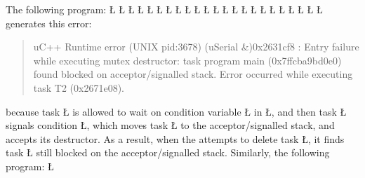 \documentclass[openright,twoside]{report}
\begin{document}
The following program:
\LGinlinefalse\LGbegin\lgrinde
\L{}
\L{\LB{}}
\L{}
\L{\LB{}}
\L{}
\L{\LB{}}
\L{\LB{}}
\CE{}\L{\LB{}}
\CE{}\L{\LB{}}
\CE{}\L{\LB{}}
\L{\LB{\};}}
\endlgrinde\LGend
\LGinlinefalse\LGbegin\lgrinde
\L{}
\L{\LB{}}
\L{\LB{}}
\L{}
\L{\LB{}}
\L{\LB{\};}}
\endlgrinde\LGend
\LGinlinefalse\LGbegin\lgrinde
\L{}
\L{\LB{}}
\L{\LB{}}
\L{\LB{}}
\CE{}\L{\LB{}}
\L{\LB{\}}}
\endlgrinde\LGend
generates this error:
\begin{quote}
\BGfont
uC++ Runtime error (UNIX pid:3678) (uSerial \&)0x2631cf8 : Entry failure while executing mutex destructor: task program main (0x7ffcba9bd0e0) found blocked on acceptor/signalled stack.
Error occurred while executing task T2 (0x2671e08).
\end{quote}
because task \LGinlinetrue\LGbegin\lgrinde\L{}\endlgrinde\LGend{} is allowed to wait on condition variable \LGinlinetrue\LGbegin\lgrinde\L{}\endlgrinde\LGend{} in \LGinlinetrue\LGbegin\lgrinde\L{}\endlgrinde\LGend{}, and then task \LGinlinetrue\LGbegin\lgrinde\L{}\endlgrinde\LGend{} signals condition \LGinlinetrue\LGbegin\lgrinde\L{}\endlgrinde\LGend{}, which moves task \LGinlinetrue\LGbegin\lgrinde\L{}\endlgrinde\LGend{} to the acceptor/signalled stack, and accepts its destructor.
As a result, when the  attempts to delete task \LGinlinetrue\LGbegin\lgrinde\L{}\endlgrinde\LGend{}, it finds task \LGinlinetrue\LGbegin\lgrinde\L{}\endlgrinde\LGend{} still blocked on the acceptor/signalled stack.
Similarly, the following program:
\LGinlinefalse\LGbegin\lgrinde
\L{}
\end{document}
